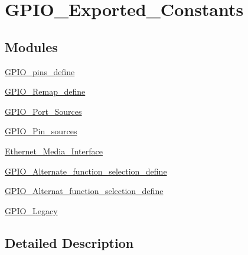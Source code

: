 \hypertarget{group___g_p_i_o___exported___constants}{\section{G\-P\-I\-O\-\_\-\-Exported\-\_\-\-Constants}
\label{group___g_p_i_o___exported___constants}
}
\subsection*{Modules}
\begin{DoxyCompactItemize}
\item 
\hyperlink{group___g_p_i_o__pins__define}{G\-P\-I\-O\-\_\-pins\-\_\-define}
\item 
\hyperlink{group___g_p_i_o___remap__define}{G\-P\-I\-O\-\_\-\-Remap\-\_\-define}
\item 
\hyperlink{group___g_p_i_o___port___sources}{G\-P\-I\-O\-\_\-\-Port\-\_\-\-Sources}
\item 
\hyperlink{group___g_p_i_o___pin__sources}{G\-P\-I\-O\-\_\-\-Pin\-\_\-sources}
\item 
\hyperlink{group___ethernet___media___interface}{Ethernet\-\_\-\-Media\-\_\-\-Interface}
\item 
\hyperlink{group___g_p_i_o___alternate__function__selection__define}{G\-P\-I\-O\-\_\-\-Alternate\-\_\-function\-\_\-selection\-\_\-define}
\item 
\hyperlink{group___g_p_i_o___alternat__function__selection__define}{G\-P\-I\-O\-\_\-\-Alternat\-\_\-function\-\_\-selection\-\_\-define}
\item 
\hyperlink{group___g_p_i_o___legacy}{G\-P\-I\-O\-\_\-\-Legacy}
\end{DoxyCompactItemize}


\subsection{Detailed Description}
